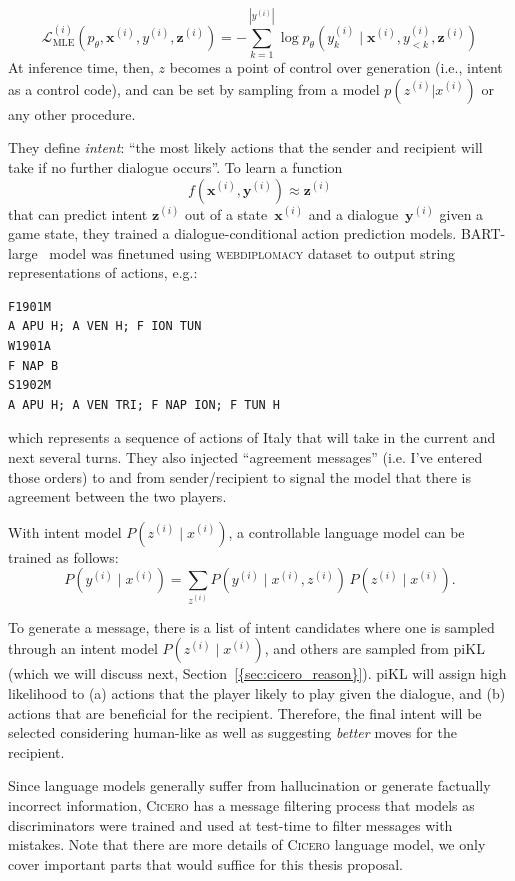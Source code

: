 \documentclass[oneside]{memoir}
\newcommand{\cicero}{\abr{Cicero} }
\newcommand{\abr}[1]{\textsc{#1}}
\begin{document}
\begin{equation}
\mathcal{L}^{(i)}_{\text{MLE}}(p_\theta, \mathbf{x}^{(i)}, y^{(i)},  \mathbf{z}^{(i)}) = - \sum_{k=1}^{|y^{(i)}|} \log p_\theta\left(y^{(i)}_k \mid \mathbf{x}^{(i)}, y^{(i)}_{<k}, \mathbf{z}^{(i)}\right)
\label{eq:intent}
\end{equation}
At inference time, then, $z$ becomes a point of control over generation (i.e., intent as a control code), and can be set by sampling from a model $p(z^{(i)} | x^{(i)})$ or any other procedure. 

They define \textit{intent}: ``the most likely actions that the sender and recipient will take if no further dialogue occurs''. To learn a function \[
f(\mathbf{x}^{(i)}, \mathbf{y}^{(i)}) \approx \mathbf{z}^{(i)}
\] that can predict intent $\mathbf{z}^{(i)}$ out of a state~$\mathbf{x}^{(i)}$ and a dialogue~$\mathbf{y}^{(i)}$ given a game state, they trained a dialogue-conditional action prediction models. BART-large~\cite{} model was finetuned using \abr{webdiplomacy} dataset to output string representations of actions, e.g.:
\begin{verbatim}
F1901M
A APU H; A VEN H; F ION TUN
W1901A
F NAP B
S1902M
A APU H; A VEN TRI; F NAP ION; F TUN H
\end{verbatim}
which represents a sequence of actions of Italy that will take in the current and next several turns. They also injected ``agreement messages'' (i.e. I've entered those orders) to and from sender/recipient to signal the model that there is agreement between the two players.

With intent model $P(z^{(i)} \mid x^{(i)})$, a controllable language model can be trained as follows:
\[
P(y^{(i)} \mid x^{(i)}) = \sum_{z^{(i)}} P(y^{(i)} \mid x^{(i)}, z^{(i)}) \, P(z^{(i)} \mid x^{(i)}).
\]

To generate a message, there is a list of intent candidates where one is sampled through an intent model $P(z^{(i)} \mid x^{(i)})$, and others are sampled from piKL (which we will discuss next, Section~\ref{{sec:cicero_reason}}). piKL will assign high likelihood to (a) actions that the player likely to play given the dialogue, and (b) actions that are beneficial for the recipient. Therefore, the final intent will be selected considering human-like as well as suggesting \textit{better} moves for the recipient. 

Since language models generally suffer from hallucination or generate factually incorrect information, \cicero has a message filtering process that models as discriminators were trained and used at test-time to filter messages with mistakes. Note that there are more details of \cicero language model, we only cover important parts that would suffice for this thesis proposal.
\end{document}
